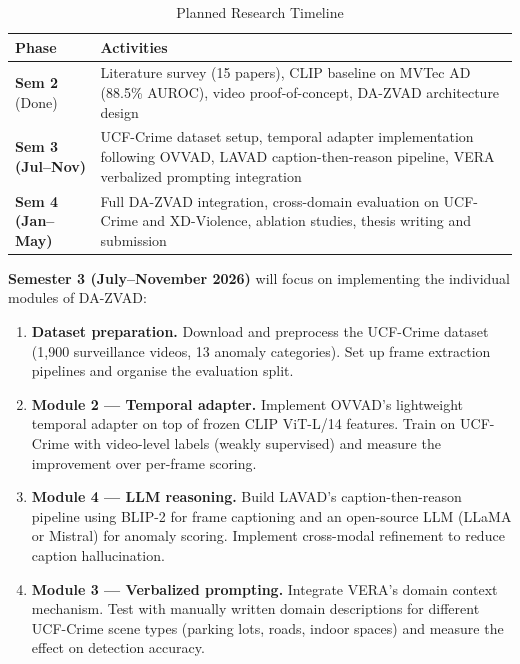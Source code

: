 \begin{table}[h]
\centering
\caption{Planned Research Timeline}
\label{tab:timeline}
\renewcommand{\arraystretch}{1.25}
\small
\begin{tabular}{@{} l p{5.5cm} @{}}
\toprule
\textbf{Phase} & \textbf{Activities} \\
\midrule
\textbf{Sem 2} (Done) & Literature survey (15 papers), CLIP baseline on MVTec AD (88.5\% AUROC), video proof-of-concept, DA-ZVAD architecture design \\
\textbf{Sem 3 (Jul--Nov)} & UCF-Crime dataset setup, temporal adapter implementation following OVVAD, LAVAD caption-then-reason pipeline, VERA verbalized prompting integration \\
\textbf{Sem 4 (Jan--May)} & Full DA-ZVAD integration, cross-domain evaluation on UCF-Crime and XD-Violence, ablation studies, thesis writing and submission \\
\bottomrule
\end{tabular}
\end{table}

\noindent\textbf{Semester 3 (July--November 2026)} will focus on implementing the individual modules of DA-ZVAD:

\begin{enumerate}[leftmargin=*]
    \item \textbf{Dataset preparation.} Download and preprocess the UCF-Crime dataset (1{,}900 surveillance videos, 13 anomaly categories). Set up frame extraction pipelines and organise the evaluation split.

    \item \textbf{Module 2 --- Temporal adapter.} Implement OVVAD's lightweight temporal adapter on top of frozen CLIP ViT-L/14 features. Train on UCF-Crime with video-level labels (weakly supervised) and measure the improvement over per-frame scoring.

    \item \textbf{Module 4 --- LLM reasoning.} Build LAVAD's caption-then-reason pipeline using BLIP-2 for frame captioning and an open-source LLM (LLaMA or Mistral) for anomaly scoring. Implement cross-modal refinement to reduce caption hallucination.

    \item \textbf{Module 3 --- Verbalized prompting.} Integrate VERA's domain context mechanism. Test with manually written domain descriptions for different UCF-Crime scene types (parking lots, roads, indoor spaces) and measure the effect on detection accuracy.
\end{enumerate}

